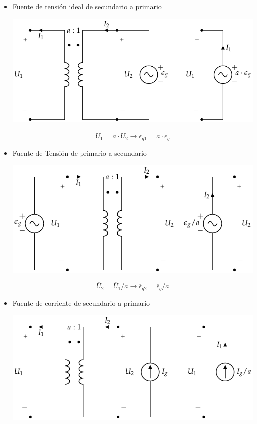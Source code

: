\begin{itemize}
\item Fuente de tensión ideal de secundario a primario
  \begin{center}
    \includegraphics[height=.2\textheight]{../figs/TrafoIdeal_VSec.pdf}
  \end{center}

  \[
    \overline{U}_1 = a \cdot \overline{U}_2 \rightarrow
    \boxed{\overline{\epsilon}_{g1} = a \cdot \overline{\epsilon}_g}
  \]
\item Fuente de Tensión de primario a secundario
  \begin{center}
    \includegraphics[height=.2\textheight]{../figs/TrafoIdeal_VPrim.pdf}
  \end{center}

  \[
    \overline{U}_2 = \overline{U}_1 / a \rightarrow
    \boxed{\overline{\epsilon}_{g2} = \overline{\epsilon}_g / a}
  \]
\item Fuente de corriente de secundario a primario
  \begin{center}
    \includegraphics[height=.2\textheight]{../figs/TrafoIdeal_ISec.pdf}
  \end{center}


\end{itemize}
